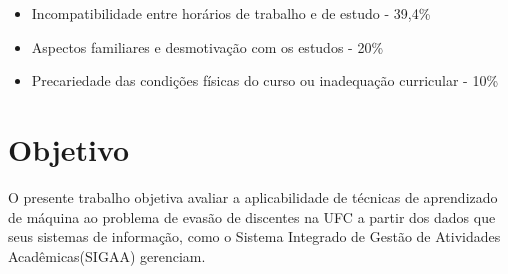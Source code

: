 \begin{itemize}
\item Incompatibilidade entre horários de trabalho e de estudo - 39,4\%
\item Aspectos familiares e desmotivação com os estudos - 20\%
\item Precariedade das condições físicas do curso ou inadequação curricular - 10\%
\end{itemize}

\section{Objetivo}
O presente trabalho objetiva avaliar a aplicabilidade de técnicas de aprendizado de máquina ao problema de evasão de discentes na UFC a partir dos dados que seus sistemas de informação, como o Sistema Integrado de Gestão de Atividades Acadêmicas(SIGAA) gerenciam.


